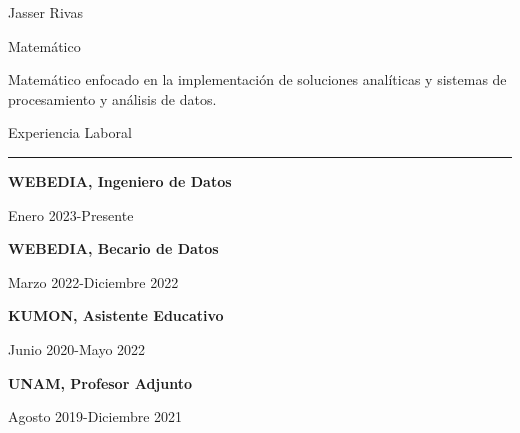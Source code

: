 \documentclass{article}
\begin{document}
\hfill
\begin{minipage}[t]{0.60\textwidth}
\setlength{\baselineskip}{1.5\baselineskip}
\vspace{0.5cm}
{\huge Jasser Rivas}

{\large Matemático}

\vspace{0.5cm}
 
Matemático enfocado en la implementación de soluciones analíticas y
sistemas de procesamiento y análisis de datos.

\vspace{0.5cm}

{\large Experiencia Laboral}
\rule{\linewidth}{0.4pt}


\vspace{0.2cm}

{\large \textbf{WEBEDIA, Ingeniero de Datos}}

{\small Enero 2023-Presente}


{\large \textbf{WEBEDIA, Becario de Datos}}

{\small Marzo 2022-Diciembre 2022}



{\large \textbf{KUMON, Asistente Educativo}}

{\small Junio 2020-Mayo 2022}




{\large \textbf{UNAM, Profesor Adjunto}}

{\small Agosto 2019-Diciembre 2021}


\end{minipage}
\end{document}

